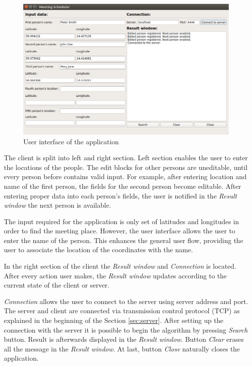 \documentclass[thesis=M,english]{FITthesis}[2012/10/20]
\begin{document}
\begin{figure}[H]
\centering
\includegraphics[width=1\textwidth]{pics/UIFinal}
\caption{User interface of the application}
\label{pic:UIFinal}
\end{figure}

The client is split into left and right section. Left section enables the user to enter the locations of the people. The edit blocks for other persons are uneditable, until every person before contains valid input. For example, after entering location and name of the first person, the fields for the second person become editable. After entering proper data into each person's fields, the user is notified in the \textit{Result window} the next person is available. 

The input required for the application is only set of latitudes and longitudes in order to find the meeting place. However, the user interface allows the user to enter the name of the person. This enhances the general user flow, providing the user to associate the location of the coordinates with the name.

In the right section of the client the \textit{Result window} and \textit{Connection} is located. After every action user makes, the \textit{Result window} updates according to the current state of the client or server.

\textit{Connection} allows the user to connect to the server using server address and port. The server and client are connected via transmission control protocol (TCP) as explained in the beginning of the Section \ref{sec:server}. After setting up the connection with the server it is possible to begin the algorithm by pressing \textit{Search} button. Result is afterwards displayed in the \textit{Result window}. Button \textit{Clear} erases all the message in the \textit{Result window}. At last, button \textit{Close} naturally closes the application.
\end{document}
